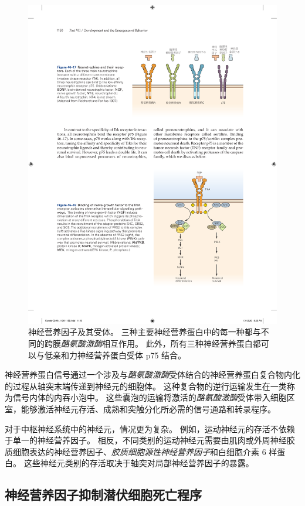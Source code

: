 \begin{figure}[htbp]
	\centering
	\includegraphics[width=0.81\linewidth]{chap46/fig_46_17}
	\caption{神经营养因子及其受体。
		三种主要神经营养蛋白中的每一种都与不同的跨膜\textit{酪氨酸激酶}相互作用。
		此外，所有三种神经营养蛋白都可以与低亲和力神经营养蛋白受体 p75 结合\cite{reichardt1997neurotrophic}。}
	\label{fig:46_17}
\end{figure}


神经营养蛋白信号通过一个涉及与\textit{酪氨酸激酶}受体结合的神经营养蛋白复合物内化的过程从轴突末端传递到神经元的细胞体。
这种复合物的逆行运输发生在一类称为信号内体的内吞小泡中。
这些囊泡的运输将激活的\textit{酪氨酸激酶}受体带入细胞区室，能够激活神经元存活、成熟和突触分化所必需的信号通路和转录程序。


对于中枢神经系统中的神经元，情况更为复杂。
例如，运动神经元的存活不依赖于单一的神经营养因子。
相反，不同类别的运动神经元需要由肌肉或外周神经胶质细胞表达的神经营养因子、\textit{胶质细胞源性神经营养因子}和白细胞介素 6 样蛋白。
这些神经元类别的存活取决于轴突对局部神经营养因子的暴露。



\subsection{神经营养因子抑制潜伏细胞死亡程序}

